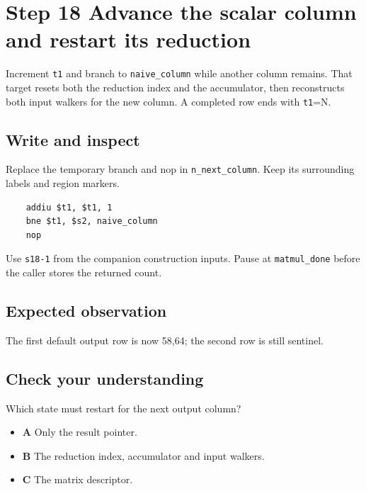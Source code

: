 \section{Step 18 Advance the scalar column and restart its reduction}\label{matmul-s18}

Increment \texttt{t1} and branch to \texttt{naive\_column} while another column remains. That target resets both the reduction index and the accumulator, then reconstructs both input walkers for the new column. A completed row ends with \texttt{t1}=N.

\subsection{Write and inspect}
Replace the temporary branch and nop in \texttt{n\_next\_column}. Keep its surrounding labels and region markers.

\begin{verbatim}
    addiu $t1, $t1, 1
    bne $t1, $s2, naive_column
    nop
\end{verbatim}
Use \texttt{s18-1} from the companion construction inputs. Pause at \texttt{matmul\_done} before the caller stores the returned count.

\subsection{Expected observation}
The first default output row is now 58,64; the second row is still sentinel.

\subsection{Check your understanding}
Which state must restart for the next output column?

\begin{itemize}
\item \textbf{A} Only the result pointer.
\item \textbf{B} The reduction index, accumulator and input walkers.
\item \textbf{C} The matrix descriptor.
\end{itemize}
